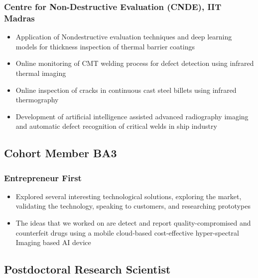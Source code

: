 \documentclass{my_cv}%
\begin{document}
\subsubsection{Centre for Non-Destructive Evaluation (CNDE), IIT Madras}
\begin{itemize}[leftmargin=0.15in]
\setlength\itemsep{-0.1em}
\color{mygray}
\item Application of Nondestructive evaluation techniques and deep learning models for thickness inspection of thermal barrier coatings
\item Online monitoring of CMT welding process for defect detection using infrared thermal imaging
\item Online inspection of cracks in continuous cast steel billets using infrared thermography
\item Development of artificial intelligence assisted advanced radiography imaging and automatic defect recognition of critical welds in ship industry
\end{itemize}%

\subsection{Cohort Member BA3}
\subsubsection{Entrepreneur First}
\begin{itemize}[leftmargin=0.15in]
\setlength\itemsep{-0.1em}
\color{mygray}
\item Explored several interesting technological solutions, exploring the market, validating the technology, speaking to customers, and researching prototypes
\item The ideas that we worked on are detect and report quality-compromised and counterfeit drugs using a mobile cloud-based cost-effective hyper-spectral Imaging based AI device
\end{itemize}

\subsection{Postdoctoral Research Scientist}
\end{document}

